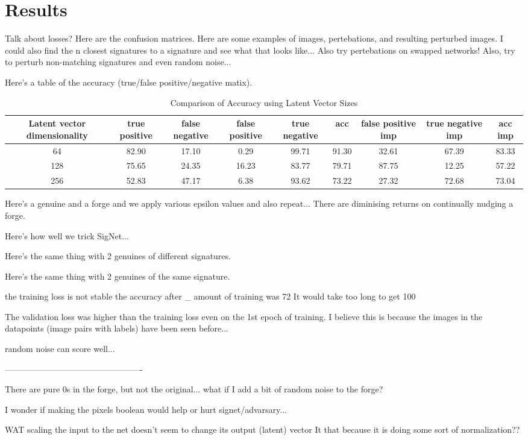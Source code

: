 \section{Results}\label{sec:results}

Talk about losses?
Here are the confusion matrices.
Here are some examples of images, pertebations, and resulting perturbed images.
I could also find the n closest signatures to a signature and see what that looks like...
Also try pertebations on swapped networks!
Also, try to perturb non-matching signatures and even random noise...

Here's a table of the accuracy (true/false positive/negative matix).

\begin{table}
    \centering
    \begin{tabular}{|c c c c c c c c c|}
        \hline
        Latent vector dimensionality & true positive & false negative & false positive & true negative & acc & false positive imp & true negative imp & acc imp\\ [0.1ex]
        \hline
        64  & 82.90 & 17.10 & 0.29 & 99.71 & 91.30 & 32.61 & 67.39 & 83.33\\
        128 & 75.65 & 24.35 & 16.23 & 83.77 & 79.71 & 87.75 & 12.25 & 57.22\\
        256 & 52.83 & 47.17 & 6.38 & 93.62 & 73.22 & 27.32 & 72.68 & 73.04\\ [0.1ex]
        \hline
    \end{tabular}
    \caption{Comparison of Accuracy using Latent Vector Sizes}
    \label{table:1}
\end{table}

Here's a genuine and a forge and we apply various epsilon values and also repeat...
    There are diminising returns on continually nudging a forge.

Here's how well we trick SigNet...

Here's the same thing with 2 genuines of different signatures.

Here's the same thing with 2 genuines of the same signature.


the training loss is not stable
the accuracy after \_ amount of training was 72%
It would take too long to get 100%

The validation loss was higher than the training loss even on the 1st epoch of training.
I believe this is because the images in the datapoints (image pairs with labels) have been seen before...


random noise can score well...

-------------------------------------------------

There are pure 0s in the forge, but not the original...
what if I add a bit of random noise to the forge?

I wonder if making the pixels boolean would help or hurt signet/advarsary...





WAT
    scaling the input to the net doesn't seem to change its output (latent) vector
    It that because it is doing some sort of normalization??
